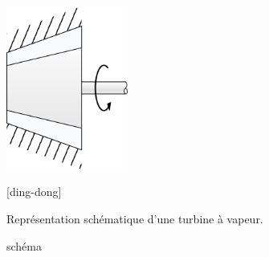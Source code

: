 {\begin{minipage}[b]{0.45\linewidth}
\end{minipage}\hspace{1cm}%
\begin{minipage}[b]{0.45\linewidth}
	\begin{center}
		\includegraphics[width=4cm]{images/symbole_turbine.png}
	\end{center}
	\captionsetup{singlelinecheck=off}
   [ding-dong]{Représentation schématique d’une turbine à vapeur.\begin{credits}schéma \ccbysa \olivier\end{credits}}
	\label{fig_centrale_turbine2}\vspace{1.25cm}
\end{minipage}\vspace{0.5cm}
}%

